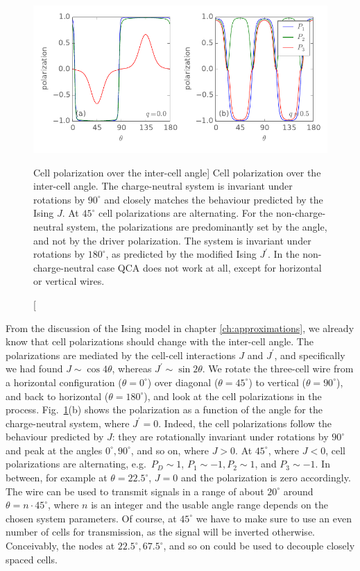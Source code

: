 \begin{figure}
  \center
  \includegraphics{three_cells_P_over_theta}
  \caption
  [Cell polarization over the inter-cell angle]
  {
  Cell polarization over the inter-cell angle. The charge-neutral system is
  invariant under rotations by $90^{\circ}$ and closely matches the behaviour
  predicted by the Ising $J$. At $45^{\circ}$ cell polarizations are
  alternating. For the non-charge-neutral system, the polarizations are
  predominantly set by the angle, and not by the driver polarization. The system
  is invariant under rotations by $180^{\circ}$, as predicted by the modified
  Ising $J^{\prime}$. In the non-charge-neutral case QCA does not work at all,
  except for horizontal or vertical wires.
  }
  \label{fig:three_cells_P_over_theta}
\end{figure}

From the discussion of the Ising model in chapter \ref{ch:approximations}, we
already know that cell polarizations should change with the inter-cell angle.
The polarizations are mediated by the cell-cell interactions $J$ and
$J^{\prime}$, and specifically we had found $J \sim \cos{4 \theta}$, whereas
$J^{\prime} \sim \sin{2 \theta}$. We rotate the three-cell wire from a
horizontal configuration ($\theta = 0^{\circ}$) over diagonal ($\theta =
45^{\circ}$) to vertical ($\theta = 90^{\circ}$), and back to horizontal
($\theta = 180^{\circ}$), and look at the cell polarizations in the process.
Fig.~\ref{fig:three_cells_P_over_theta}(b) shows the polarization as a function
of the angle for the charge-neutral system, where $J^{\prime} = 0$. Indeed, the
cell polarizations follow the behaviour predicted by $J$: they are rotationally
invariant under rotations by $90^{\circ}$ and peak at the angles $0^{\circ},
90^{\circ}$, and so on, where $J > 0$. At $45^{\circ}$, where $J < 0$, cell
polarizations are alternating, e.g.~$P_D \sim 1$, $P_1 \sim -1, P_2 \sim 1$, and
$P_3 \sim -1$. In between, for example at $\theta = 22.5^{\circ}$, $J = 0$ and
the polarization is zero accordingly. The wire can be used to transmit signals
in a range of about $20^{\circ}$ around $\theta = n \cdot 45^{\circ}$, where $n$
is an integer and the usable angle range depends on the chosen system
parameters. Of course, at $45^{\circ}$ we have to make sure to use an even
number of cells for transmission, as the signal will be inverted otherwise.
Conceivably, the nodes at $22.5^{\circ}, 67.5^{\circ}$, and so on could be used
to decouple closely spaced cells.

